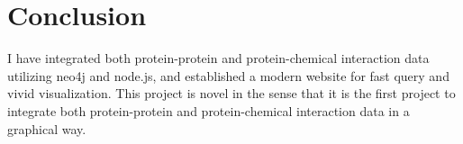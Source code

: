 \documentclass[10pt,conference,compsocconf]{../IEEEtran}
\begin{document}
\section{Conclusion}

I have integrated both protein-protein and protein-chemical interaction data utilizing neo4j and node.js, and established a modern website for fast query and vivid visualization. This project is novel in the sense that it is the first project to integrate both protein-protein and protein-chemical interaction data in a graphical way.



\end{document}
